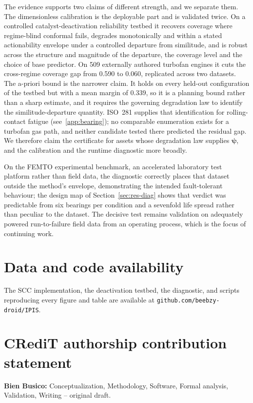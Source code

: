 \documentclass[review,times]{elsarticle}
\theoremstyle{definition}
\theoremstyle{remark}
\begin{document}
The evidence supports two claims of different strength, and we separate them. The dimensionless
calibration is the deployable part and is validated twice. On a controlled catalyst-deactivation
reliability testbed it recovers coverage where regime-blind conformal fails, degrades monotonically
and within a stated actionability envelope under a controlled departure from similitude, and is
robust across the structure and magnitude of the departure, the coverage level and the choice of
base predictor. On 509 externally authored turbofan engines it cuts the cross-regime coverage gap
from 0.590 to 0.060, replicated across two datasets. The a-priori bound is the narrower claim. It
holds on every held-out configuration of the testbed but with a mean margin of 0.339, so it is a
planning bound rather than a sharp estimate, and it requires the governing degradation law to
identify the similitude-departure quantity. ISO~281 supplies that identification for rolling-contact
fatigue (see~\ref{app:bearing}); no comparable enumeration exists for a turbofan gas path, and
neither candidate tested there predicted the residual gap. We therefore claim the certificate for
assets whose degradation law supplies $\boldsymbol\psi$, and the calibration and the runtime
diagnostic more broadly.

On the FEMTO experimental benchmark, an accelerated laboratory test platform rather than field data,
the diagnostic correctly places that dataset outside the method's envelope, demonstrating the
intended fault-tolerant behaviour; the design map of Section~\ref{sec:res-diag} shows that verdict
was predictable from six bearings per condition and a sevenfold life spread rather than peculiar to
the dataset. The decisive test remains validation on adequately powered run-to-failure field data
from an operating process, which is the focus of continuing work.

\section*{Data and code availability}
The SCC implementation, the deactivation testbed, the diagnostic, and scripts reproducing every
figure and table are available at \texttt{github.com/beebzy-droid/IPIS}.

\section*{CRediT authorship contribution statement}
\textbf{Bien Busico:} Conceptualization, Methodology, Software, Formal analysis, Validation,
Writing -- original draft.
\end{document}
